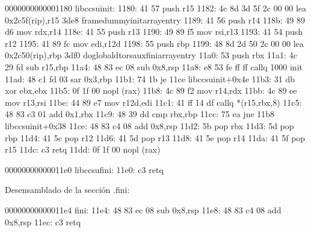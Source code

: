 \documentclass[letterpaper,10pt,spanish]{sphinxmanual}
\begin{document}
\begin{sphinxVerbatim}[commandchars=\\\{\}]
0000000000001180 \PYGZlt{}\PYGZus{}\PYGZus{}libc\PYGZus{}csu\PYGZus{}init\PYGZgt{}:
    1180:   41 57                   push   \PYGZpc{}r15
    1182:   4c 8d 3d 5f 2c 00 00    lea    0x2c5f(\PYGZpc{}rip),\PYGZpc{}r15        \PYGZsh{} 3de8 \PYGZlt{}\PYGZus{}\PYGZus{}frame\PYGZus{}dummy\PYGZus{}init\PYGZus{}array\PYGZus{}entry\PYGZgt{}
    1189:   41 56                   push   \PYGZpc{}r14
    118b:   49 89 d6                mov    \PYGZpc{}rdx,\PYGZpc{}r14
    118e:   41 55                   push   \PYGZpc{}r13
    1190:   49 89 f5                mov    \PYGZpc{}rsi,\PYGZpc{}r13
    1193:   41 54                   push   \PYGZpc{}r12
    1195:   41 89 fc                mov    \PYGZpc{}edi,\PYGZpc{}r12d
    1198:   55                      push   \PYGZpc{}rbp
    1199:   48 8d 2d 50 2c 00 00    lea    0x2c50(\PYGZpc{}rip),\PYGZpc{}rbp        \PYGZsh{} 3df0 \PYGZlt{}\PYGZus{}\PYGZus{}do\PYGZus{}global\PYGZus{}dtors\PYGZus{}aux\PYGZus{}fini\PYGZus{}array\PYGZus{}entry\PYGZgt{}
    11a0:   53                      push   \PYGZpc{}rbx
    11a1:   4c 29 fd                sub    \PYGZpc{}r15,\PYGZpc{}rbp
    11a4:   48 83 ec 08             sub    \PYGZdl{}0x8,\PYGZpc{}rsp
    11a8:   e8 53 fe ff ff          callq  1000 \PYGZlt{}\PYGZus{}init\PYGZgt{}
    11ad:   48 c1 fd 03             sar    \PYGZdl{}0x3,\PYGZpc{}rbp
    11b1:   74 1b                   je     11ce \PYGZlt{}\PYGZus{}\PYGZus{}libc\PYGZus{}csu\PYGZus{}init+0x4e\PYGZgt{}
    11b3:   31 db                   xor    \PYGZpc{}ebx,\PYGZpc{}ebx
    11b5:   0f 1f 00                nopl   (\PYGZpc{}rax)
    11b8:   4c 89 f2                mov    \PYGZpc{}r14,\PYGZpc{}rdx
    11bb:   4c 89 ee                mov    \PYGZpc{}r13,\PYGZpc{}rsi
    11be:   44 89 e7                mov    \PYGZpc{}r12d,\PYGZpc{}edi
    11c1:   41 ff 14 df             callq  *(\PYGZpc{}r15,\PYGZpc{}rbx,8)
    11c5:   48 83 c3 01             add    \PYGZdl{}0x1,\PYGZpc{}rbx
    11c9:   48 39 dd                cmp    \PYGZpc{}rbx,\PYGZpc{}rbp
    11cc:   75 ea                   jne    11b8 \PYGZlt{}\PYGZus{}\PYGZus{}libc\PYGZus{}csu\PYGZus{}init+0x38\PYGZgt{}
    11ce:   48 83 c4 08             add    \PYGZdl{}0x8,\PYGZpc{}rsp
    11d2:   5b                      pop    \PYGZpc{}rbx
    11d3:   5d                      pop    \PYGZpc{}rbp
    11d4:   41 5c                   pop    \PYGZpc{}r12
    11d6:   41 5d                   pop    \PYGZpc{}r13
    11d8:   41 5e                   pop    \PYGZpc{}r14
    11da:   41 5f                   pop    \PYGZpc{}r15
    11dc:   c3                      retq
    11dd:   0f 1f 00                nopl   (\PYGZpc{}rax)

00000000000011e0 \PYGZlt{}\PYGZus{}\PYGZus{}libc\PYGZus{}csu\PYGZus{}fini\PYGZgt{}:
    11e0:   c3                      retq

Desensamblado de la sección .fini:

00000000000011e4 \PYGZlt{}\PYGZus{}fini\PYGZgt{}:
    11e4:   48 83 ec 08             sub    \PYGZdl{}0x8,\PYGZpc{}rsp
    11e8:   48 83 c4 08             add    \PYGZdl{}0x8,\PYGZpc{}rsp
    11ec:   c3                      retq
\end{sphinxVerbatim}
\end{document}
